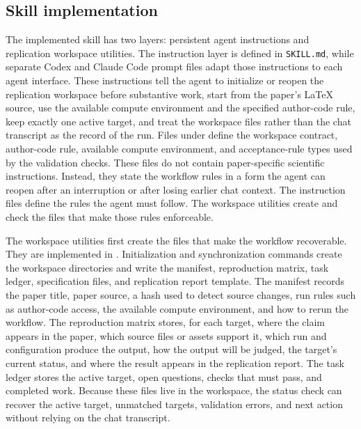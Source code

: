 \documentclass[authoryear,5p,times,nopreprintline]{elsarticle}
\begin{document}
\subsection{Skill implementation}\label{sec:skill_implementation}
The implemented skill has two layers: persistent agent instructions and replication workspace utilities.
The instruction layer is defined in \texttt{SKILL.md}, while separate Codex and Claude Code prompt files adapt those instructions to each agent interface.
These instructions tell the agent to initialize or reopen the replication workspace before substantive work, start from the paper's \LaTeX{} source, use the available compute environment and the specified author-code rule, keep exactly one active target, and treat the workspace files rather than the chat transcript as the record of the run.
Files under  define the workspace contract, author-code rule, available compute environment, and acceptance-rule types used by the validation checks.
These files do not contain paper-specific scientific instructions.
Instead, they state the workflow rules in a form the agent can reopen after an interruption or after losing earlier chat context.
The instruction files define the rules the agent must follow.
The workspace utilities create and check the files that make those rules enforceable.

The workspace utilities first create the files that make the workflow recoverable.
They are implemented in .
Initialization and synchronization commands create the workspace directories and write the manifest, reproduction matrix, task ledger, specification files, and replication report template.
The manifest records the paper title, paper source, a hash used to detect source changes, run rules such as author-code access, the available compute environment, and how to rerun the workflow.
The reproduction matrix stores, for each target, where the claim appears in the paper, which source files or assets support it, which run and configuration produce the output, how the output will be judged, the target's current status, and where the result appears in the replication report.
The task ledger stores the active target, open questions, checks that must pass, and completed work.
Because these files live in the workspace, the status check can recover the active target, unmatched targets, validation errors, and next action without relying on the chat transcript.
\end{document}
